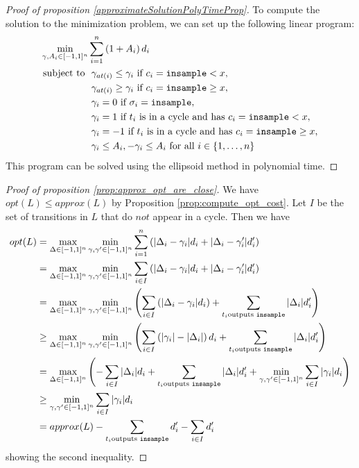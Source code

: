\begin{proof}[Proof of proposition \ref{approximateSolutionPolyTimeProp}]
    To compute the solution to the minimization problem, we can set up the following linear program: 
    \begin{align*}
        \min_{\gamma, A_i \in [-1, 1]^n} &\sum_{i = 1}^n \left(1 + A_i \right) d_i \\ 
            \text{subject to } 
            &\ \gamma_{at(i)} \leq \gamma_i \text{ if } c_i = \texttt{insample} < x, \\
            &\ \gamma_{at(i)} \geq \gamma_i \text{ if } c_i = \texttt{insample}\geq x, \\
            &\ \gamma_i = 0 \text{ if } \sigma_i = \texttt{insample}, \\
            &\ \gamma_i = 1 \text{ if } t_i \text{ is in a cycle and has } c_i = \texttt{insample} < x,\\ 
            &\ \gamma_i = -1 \text{ if } t_i \text{ is in a cycle and has } c_i = \texttt{insample}\geq x,\\
            &\ \gamma_i \leq A_i, -\gamma_i \leq A_i \text{ for all } i \in \{1, \dots, n\} 
    \end{align*}
    This program can be solved using the ellipsoid method in polynomial time.
\end{proof}


\begin{proof}[Proof of proposition \ref{prop:approx_opt_are_close}]
    We have $opt(L) \leq approx(L)$ by Proposition \ref{prop:compute_opt_cost}. Let $I$ be the set of transitions in $L$ that do $\textit{not}$ appear in a cycle. Then we have
    \begin{align*}
        opt(L) &= \max_{\Delta \in [-1, 1]^n} \min_{\gamma, \gamma' \in [-1, 1]^n} \sum_{i = 1}^n \left(|\Delta_i - \gamma_i| d_i + |\Delta_i - \gamma_i'|d_i' \right)\\
        &= \max_{\Delta \in [-1, 1]^n} \min_{\gamma, \gamma' \in [-1, 1]^n} \sum_{i \in I} \left(|\Delta_i - \gamma_i| d_i + |\Delta_i - \gamma_i'|d_i' \right)\\
        &= \max_{\Delta \in [-1, 1]^n} \min_{\gamma, \gamma' \in [-1, 1]^n} \left(\sum_{i \in I} \left(|\Delta_i - \gamma_i| d_i \right) + \sum_{t_i \text{outputs \texttt{insample}}} |\Delta_i| d_i' \right)\\
        &\geq \max_{\Delta \in [-1, 1]^n} \min_{\gamma, \gamma' \in [-1, 1]^n} \left(\sum_{i \in I} \left(|\gamma_i| - |\Delta_i| \right) d_i  + \sum_{t_i \text{outputs \texttt{insample}}} |\Delta_i| d_i' \right)\\
        &= \max_{\Delta \in [-1, 1]^n} \left(- \sum_{i \in I} |\Delta_i| d_i + \sum_{t_i \text{outputs \texttt{insample}}} |\Delta_i| d_i' + \min_{\gamma, \gamma' \in [-1, 1]^n} \sum_{i \in I}|\gamma_i| d_i \right)\\
        &\geq \min_{\gamma, \gamma' \in [-1, 1]^n} \sum_{i \in I}|\gamma_i| d_i \\
        &= approx(L) - \sum_{t_i \text{outputs \texttt{insample}}} d_i' - \sum_{i \in I} d_i'
    \end{align*}
    showing the second inequality.
\end{proof}

